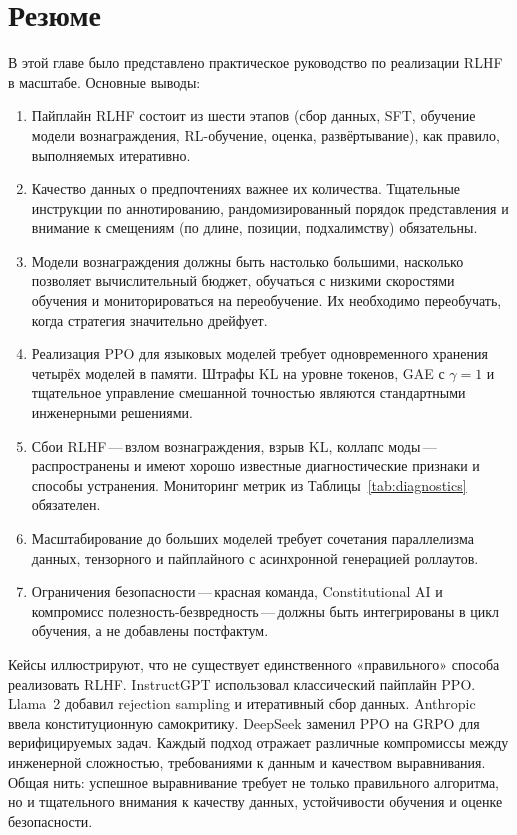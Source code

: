 \section{Резюме}
\label{sec:ch14-summary}

В этой главе было представлено практическое руководство по реализации RLHF в масштабе. Основные выводы:

\begin{enumerate}
  \item Пайплайн RLHF состоит из шести этапов (сбор данных, SFT, обучение модели вознаграждения, RL-обучение, оценка, развёртывание), как правило, выполняемых итеративно.
  \item Качество данных о предпочтениях важнее их количества. Тщательные инструкции по аннотированию, рандомизированный порядок представления и внимание к смещениям (по длине, позиции, подхалимству) обязательны.
  \item Модели вознаграждения должны быть настолько большими, насколько позволяет вычислительный бюджет, обучаться с низкими скоростями обучения и мониторироваться на переобучение. Их необходимо переобучать, когда стратегия значительно дрейфует.
  \item Реализация PPO для языковых моделей требует одновременного хранения четырёх моделей в памяти. Штрафы KL на уровне токенов, GAE с $\gamma = 1$ и тщательное управление смешанной точностью являются стандартными инженерными решениями.
  \item Сбои RLHF\,---\,взлом вознаграждения, взрыв KL, коллапс моды\,---\,распространены и имеют хорошо известные диагностические признаки и способы устранения. Мониторинг метрик из Таблицы~\ref{tab:diagnostics} обязателен.
  \item Масштабирование до больших моделей требует сочетания параллелизма данных, тензорного и пайплайного с асинхронной генерацией роллаутов.
  \item Ограничения безопасности\,---\,красная команда, Constitutional AI и компромисс полезность-безвредность\,---\,должны быть интегрированы в цикл обучения, а не добавлены постфактум.
\end{enumerate}

Кейсы иллюстрируют, что не существует единственного «правильного» способа реализовать RLHF. InstructGPT использовал классический пайплайн PPO. Llama~2 добавил rejection sampling и итеративный сбор данных. Anthropic ввела конституционную самокритику. DeepSeek заменил PPO на GRPO для верифицируемых задач. Каждый подход отражает различные компромиссы между инженерной сложностью, требованиями к данным и качеством выравнивания. Общая нить: успешное выравнивание требует не только правильного алгоритма, но и тщательного внимания к качеству данных, устойчивости обучения и оценке безопасности.

